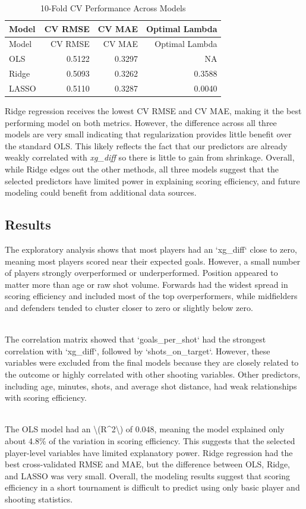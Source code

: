 \documentclass[
  letterpaper,
  DIV=11,
  numbers=noendperiod]{scrartcl}
\begin{document}
\begin{longtable}[]{@{}lrrr@{}}
\caption{10-Fold CV Performance Across Models}\tabularnewline
\toprule\noalign{}
Model & CV RMSE & CV MAE & Optimal Lambda \\
\midrule\noalign{}
\endfirsthead
\toprule\noalign{}
Model & CV RMSE & CV MAE & Optimal Lambda \\
\midrule\noalign{}
\endhead
\bottomrule\noalign{}
\endlastfoot
OLS & 0.5122 & 0.3297 & NA \\
Ridge & 0.5093 & 0.3262 & 0.3588 \\
LASSO & 0.5110 & 0.3287 & 0.0040 \\
\end{longtable}

Ridge regression receives the lowest CV RMSE and CV MAE, making it the
best performing model on both metrics. However, the difference across
all three models are very small indicating that regularization provides
little benefit over the standard OLS. This likely reflects the fact that
our predictors are already weakly correlated with \emph{xg\_diff} so
there is little to gain from shrinkage. Overall, while Ridge edges out
the other methods, all three models suggest that the selected predictors
have limited power in explaining scoring efficiency, and future modeling
could benefit from additional data sources.

\subsection{Results}\label{results}

The exploratory analysis shows that most players had an `xg\_diff` close
to zero, meaning most players scored near their expected goals. However,
a small number of players strongly overperformed or underperformed.
Position appeared to matter more than age or raw shot volume. Forwards
had the widest spread in scoring efficiency and included most of the top
overperformers, while midfielders and defenders tended to cluster closer
to zero or slightly below zero.\\
\strut \\
The correlation matrix showed that `goals\_per\_shot` had the strongest
correlation with `xg\_diff`, followed by `shots\_on\_target`. However,
these variables were excluded from the final models because they are
closely related to the outcome or highly correlated with other shooting
variables. Other predictors, including age, minutes, shots, and average
shot distance, had weak relationships with scoring efficiency.\\
\strut \\
The OLS model had an \textbackslash(R\^{}2\textbackslash) of 0.048,
meaning the model explained only about 4.8\% of the variation in scoring
efficiency. This suggests that the selected player-level variables have
limited explanatory power. Ridge regression had the best cross-validated
RMSE and MAE, but the difference between OLS, Ridge, and LASSO was very
small. Overall, the modeling results suggest that scoring efficiency in
a short tournament is difficult to predict using only basic player and
shooting statistics.
\end{document}
